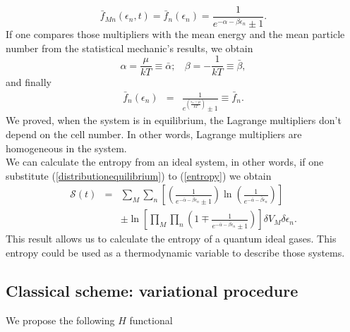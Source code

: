 \documentclass{article}
\newcommand{\de}{\delta}
\newcommand{\Ss}{\mathcal{S}}
\begin{document}
\begin{equation}
    \bar f_{Mn}(\epsilon_{n},t)=\bar f_n(\epsilon_{n}) =\frac{1}{e^{-\alpha-\beta \epsilon_n}\pm 1}.
\end{equation}{}
If one compares those multipliers with the mean energy and the mean particle number from the statistical mechanic's results, we obtain
\begin{equation}
    \alpha=\frac{\mu}{kT}\equiv \bar{\alpha}; \ \ \ \ \beta=-\frac{1}{kT}\equiv \bar{\beta},
\end{equation}{}
and finally
\begin{eqnarray}
    \bar{f}_{n}(\epsilon_{n})&=&\frac{1}{e^{(\frac{{\epsilon_n}-\bar{\mu}}{kT})}\pm 1}\equiv \bar{f}_{n}.
\end{eqnarray}{}
We proved, when the system is in equilibrium, the Lagrange multipliers don't depend on the cell number. In other words, Lagrange multipliers are homogeneous in the system.\\
We can calculate the entropy from an ideal system, in other words, if one substitute (\ref{distributionequilibrium}) to (\ref{entropy}) we obtain
\begin{eqnarray}
      \Ss(t)&=&\sum_M \sum_n  \left[\left(\frac{1}{e^{-\bar{\alpha}-\bar{\beta}\epsilon_{n}}\pm 1} \right)\ln \left(\frac{1}{e^{-\bar{\alpha}-\bar{\beta}\epsilon_{n}}} \right) \right]\nonumber \\
      &&\pm  \ln \left[\prod_{M} \prod_{n}\left(1 \mp \frac{1}{e^{-\bar{\alpha}-\bar{\beta}\epsilon_{n}}\pm 1} \right) \right] \de V_M \delta \epsilon_n\label{H-entropy}.
  \end{eqnarray}
  This result allows us to calculate the entropy of a quantum ideal gases. This entropy could be used as a thermodynamic variable to describe those systems.
\subsection{Classical scheme: variational procedure}
We propose the following $H$ functional
\end{document}
